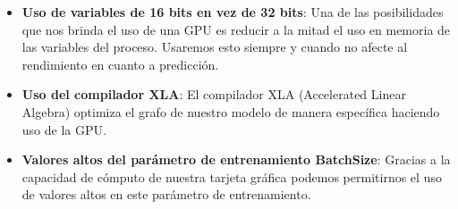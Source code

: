 \begin{itemize}
    \item \textbf{Uso de variables de 16 bits en vez de 32 bits}: Una de las posibilidades que nos brinda el uso de una GPU es reducir a la mitad el uso en memoria de las variables del proceso.
    Usaremos esto siempre y cuando no afecte al rendimiento en cuanto a predicción.
    \item \textbf{Uso del compilador XLA}: El compilador XLA (Accelerated Linear Algebra) optimiza el grafo de nuestro modelo de manera específica haciendo uso de la GPU.
    \item \textbf{Valores altos del parámetro de entrenamiento BatchSize}: Gracias a la capacidad de cómputo de nuestra tarjeta gráfica podemos permitirnos el uso de valores altos en este parámetro de entrenamiento.
\end{itemize}


